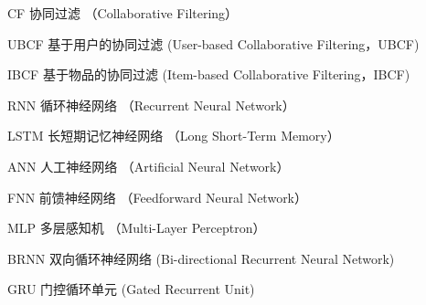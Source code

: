 ﻿\begin{denotation}


\item[CF] 协同过滤 （Collaborative Filtering）
\item[UBCF] 基于用户的协同过滤  (User-based Collaborative Filtering，UBCF)
\item[IBCF] 基于物品的协同过滤  (Item-based Collaborative Filtering，IBCF)
\item[RNN] 循环神经网络 （Recurrent Neural Network）
\item[LSTM] 长短期记忆神经网络 （Long Short-Term Memory）
\item[ANN] 人工神经网络 （Artificial Neural Network）
\item[FNN] 前馈神经网络 （Feedforward Neural Network）
\item[MLP] 多层感知机 （Multi-Layer Perceptron）
\item[BRNN] 双向循环神经网络 (Bi-directional Recurrent Neural Network)
\item[GRU] 门控循环单元 (Gated Recurrent Unit)

\end{denotation}
